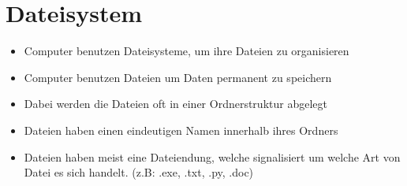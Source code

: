 \section{Dateisystem}
\begin{frame}
    \slidehead
    \begin{itemize}
        \item Computer benutzen Dateisysteme, um ihre Dateien zu organisieren
        \item Computer benutzen Dateien um Daten permanent zu speichern
        \item Dabei werden die Dateien oft in einer Ordnerstruktur abgelegt
        \item Dateien haben einen eindeutigen Namen innerhalb ihres Ordners
        \item Dateien haben meist eine Dateiendung, welche signalisiert um welche Art von Datei es sich handelt. (z.B: .exe, .txt, .py, .doc)
    \end{itemize}
\end{frame}

